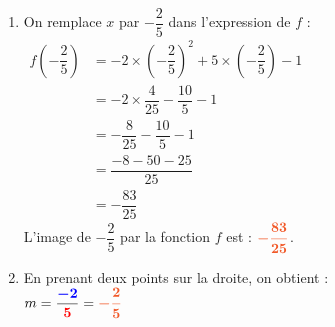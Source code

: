 \documentclass[a4paper,11pt]{article}
\newcounter{seancenum}
\begin{document}
\setcounter{seancenum}{10}
\newpage
\begin{seance}{} %
\begin{enumerate}
 \item On remplace $x$ par $-\dfrac{2}{5}$ dans l'expression de $f$ :\\
     
    $\begin{aligned}
    f\left(-\dfrac{2}{5}\right)&=-2\times \left(-\dfrac{2}{5}\right)^2+5\times \left(-\dfrac{2}{5}\right)-1\\
    &=-2\times\dfrac{4}{25}-\dfrac{10}{5}-1\\
    &=-\dfrac{8}{25}-\dfrac{10}{5}-1\\
    &=\dfrac{-8-50-25}{25}\\
    &=-\dfrac{83}{25}
    \end{aligned}$\\
    
    L'image de $-\dfrac{2}{5}$ par la fonction $f$ est : ${\color[HTML]{f15929}\boldsymbol{-\dfrac{83}{25}}}$.
\item En prenant deux points sur la droite, on obtient :\\
     
    $m=\dfrac{{\color{blue}\boldsymbol{-2}}}{{\color{red}\boldsymbol{5}}}={\color[HTML]{f15929}\boldsymbol{-\dfrac{2}{5}}}$\\\begin{tikzpicture}[baseline,scale = 0.75]


\end{tikzpicture}
\end{enumerate}
\end{seance}
\end{document}
